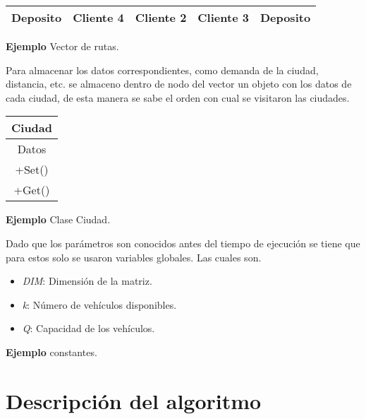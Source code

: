 \documentclass[letter, 10pt]{article}
\begin{document}
\begin{center}
 \begin{tabular}[t]{|c|c|c|c|c|}
\hline
 Deposito & Cliente 4 & Cliente 2 & Cliente 3 & Deposito \\
\hline

\end{tabular}
\end{center}
\begin{center}
\textbf{Ejemplo} Vector de rutas. 
\end{center}

Para almacenar los datos correspondientes, como demanda de la ciudad, distancia, etc. se almaceno dentro de nodo del vector un objeto con los datos de cada ciudad, de esta manera se sabe el orden 
con cual se visitaron las ciudades.
\begin{center}
 \begin{tabular}[t]{|c|}
\hline

 Ciudad \\
 \hline
Datos \\
\hline
+Set() \\
+Get() \\
\hline
 \end{tabular}
\end{center}

\begin{center}
\textbf{Ejemplo} Clase Ciudad. 
\end{center}

Dado que los par\'ametros son conocidos antes del tiempo de ejecuci\'on se tiene que para estos solo se usaron variables globales. Las cuales son.
\begin{center}
 \begin{itemize}
 \item \emph{DIM}: Dimensi\'on de la matriz.
 \item \emph{k}: N\'umero de veh\'iculos disponibles.
 \item \emph{Q}: Capacidad de los veh\'iculos.
 \end{itemize}
\end{center}
\begin{center}
\textbf{Ejemplo} constantes. 
\end{center}




\newpage

\section{Descripci\'on del algoritmo}
\end{document}

